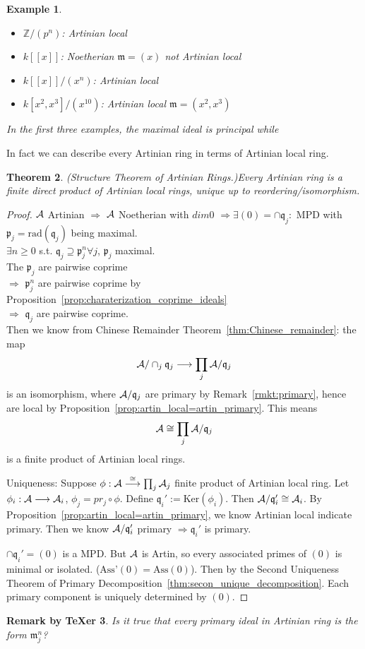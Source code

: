 \documentclass[11pt]{article}
\newtheorem{thm}{Theorem}[section]
\newtheorem{rmkt}[thm]{Remark by TeXer}
\newtheorem{ex}[thm]{Example}
\newcommand{\intg}{\mathbb Z}
\newcommand{\scm}{{\mathfrak m}}
\newcommand{\scp}{{\mathfrak p}}
\newcommand{\scq}{\mathfrak q}
\newcommand{\cala}{{\cal A}}
\newcommand{\Lrta}{\Longrightarrow}
\newcommand{\lrta}{\longrightarrow}
\begin{document}
\begin{ex}\ 
\begin{itemize}
\item $\intg/(p^n)$: Artinian   local
\item $k[[x]]$: Noetherian $\scm=(x)$ not Artinian   local
\item $k[[x]]/(x^n)$: Artinian   local
\item $k[x^2,x^3]/(x^{10})$: Artinian   local $\scm=(x^2,x^3)$
\end{itemize}
In the first three examples, the maximal ideal is principal while 
\end{ex}

In fact we can describe every Artinian   ring in terms of Artinian   local ring.
\begin{thm}(Structure Theorem of Artinian   Rings.)\label{thm:Artin_product_of_Artin_local}
Every Artinian   ring is a finite direct product of Artinian   local rings, unique up to reordering/isomorphism.
\end{thm}
\begin{proof}
$\cala$ Artinian   $\Lrta $ $\cala$ Noetherian with $dim 0$ $\Lrta\exists (0)=\cap\scq_j:$ MPD with $\scp_j=\text{rad}(\scq_j)$ being maximal.\\
$\exists n\geq 0$  s.t. $\scq_j\supseteq \scp_j^n\forall j$, $\scp_j$ maximal.\\
The $\scp_j$ are pairwise coprime\\
$\Lrta$ $\scp_j^n$ are pairwise coprime by Proposition~\ref{prop:charaterization_coprime_ideals}\\
$\Lrta$ $\scq_j$ are pairwise coprime.\\ Then we know from Chinese Remainder Theorem~\ref{thm:Chinese_remainder}:
the map
$$
\cala/\cap_j\scq_j\lrta \prod_j \cala/\scq_j
$$
 is an isomorphism, where $\cala/\scq_j$ are primary by Remark~\ref{rmkt:primary}, hence are local by Proposition~\ref{prop:artin_local=artin_primary}.
 This means 
 $$
\cala\cong\prod_j \cala/\scq_j
 $$
is a finite product of Artinian   local rings.

Uniqueness: Suppose $\phi:\cala\overset{\cong}{\lrta}\prod_j\cala_j$ finite product of Artinian   local ring. Let $\phi_i:\cala\lrta \cala_i$, $\phi_j=pr_j\circ\phi$. Define $\scq_i':=\text{Ker}(\phi_i)$. Then $\cala/\scq'_i\cong \cala_i$. By Proposition~\ref{prop:artin_local=artin_primary}, we know Artinian   local indicate primary. Then we know $\cala/\scq_i'$ primary $\Lrta\scq_i'$ is primary.

$\cap\scq_i'=(0)$ is a MPD.
But $\cala$ is Artin, so every associated primes of $(0)$ is minimal or isolated. ($\text{Ass'}(0)=\text{Ass}(0)$).  Then by the Second Uniqueness Theorem of Primary Decomposition~\ref{thm:secon_unique_decomposition}. Each primary component is uniquely determined by $(0)$.
\end{proof}
\begin{rmkt}
Is it true that every primary ideal in Artinian   ring is the form $\scm_j^n$?
\end{rmkt}
\end{document}
